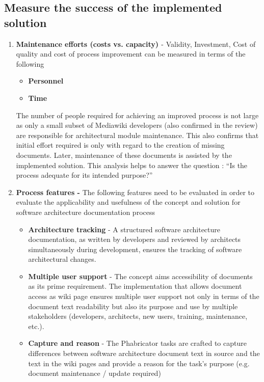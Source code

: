 \subsection{Measure the success of the implemented solution}
\begin{enumerate}
\item \textbf{Maintenance efforts (costs vs. capacity) \cite{Shahin2014}} - 
Validity, Investment, Cost of quality and cost of process improvement can be measured in terms of the following \cite{Gorschek2006}
\begin{itemize}
\item \textbf{Personnel}
\item \textbf{Time}
\end{itemize}
The number of people required for achieving an improved process is not large as only a small subset of Mediawiki developers (also confirmed in the review) are responsible for architectural module maintenance. This also confirms that initial effort required is only with regard to the creation of missing documents. Later, maintenance of these documents is assisted by the implemented solution.
\newline
This analysis helps to answer the question : \enquote{Is the process adequate for its intended purpose?}
\item \textbf{Process features - }
The following features need to be evaluated in order to evaluate the applicability and usefulness  \cite{Fuggeffa1988} of the concept and solution for software architecture documentation process
\begin{itemize}
\item \textbf{Architecture tracking} - A structured software architecture documentation, as written by developers and reviewed by architects simultaneously during development, ensures the tracking of software architectural changes.
\item \textbf{Multiple user support} - The concept aims accessibility of documents as its prime requirement. The implementation that allows document access as wiki page ensures multiple user support not only in terms of the document text readability but also   its purpose and use by multiple stakeholders (developers, architects, new users, training, maintenance, etc.).
\item \textbf{Capture and reason} - The Phabricator tasks are crafted to capture differences between software architecture document text in source and the text in the wiki pages and provide a reason for the task's purpose (e.g. document maintenance / update required)
\end{itemize}
\end{enumerate}

